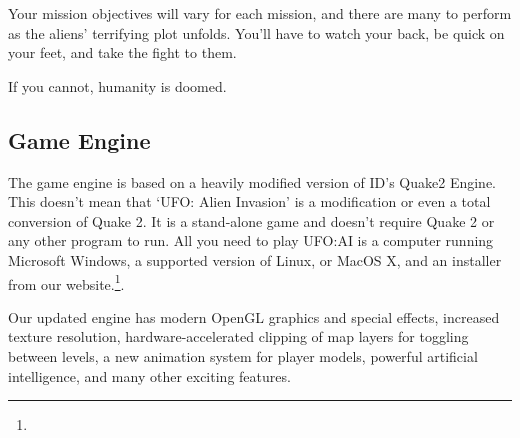 Your mission objectives will vary for each mission, and there are many to perform as the aliens' terrifying plot unfolds. You'll have to watch your back, be quick on your feet, and take the fight to them.

If you cannot, humanity is doomed.

\subsection{Game Engine}
The game engine is based on a heavily modified version of ID's Quake2 Engine. This doesn't mean that `UFO: Alien Invasion' is a modification or even a total conversion of Quake 2. It is a stand-alone game and doesn't require Quake 2 or any other program to run. All you need to play UFO:AI is a computer running Microsoft Windows, a supported version of Linux, or MacOS X, and an installer from our website.\footnote{\ufohomepage}.

Our updated engine has modern OpenGL graphics and special effects, increased texture resolution, hardware-accelerated clipping of map layers for toggling between levels, a new animation system for player models, powerful artificial intelligence, and many other exciting features.
